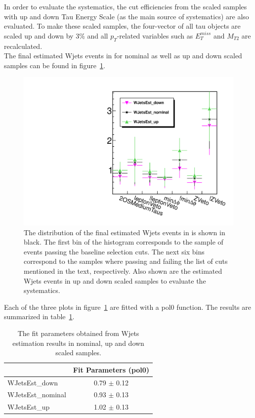 In order to evaluate the systematics, the cut efficiencies from the scaled samples with 
up and down Tau Energy Scale (as the main source of systematics) are also evaluated.
To make these scaled samples, the four-vector of all tau objects 
are scaled up and down by 3\% and all $p_T$-related variables such as $E_T^{miss}$ 
and $M_{T2}$ are recalculated.\\
The final estimated Wjets events in \binone for nominal as well as up and down scaled samples 
can be found in figure~\ref{fig:wjets_1}.  
\begin{figure}[!Hhtb]
\centering
\includegraphics[angle=0,scale=0.35]{TauTauFigs/WJets_bin1.pdf}
\caption{The distribution of the final estimated Wjets events in \binone is shown in black. 
 The first bin of the histogram corresponds to the sample of events passing the baseline selection cuts. 
The next six bins correspond to the samples where passing and failing the 
list of cuts mentioned in the text, respectively. Also shown are the estimated Wjets events in up and down scaled samples to evaluate the systematics.}
\label{fig:wjets_1}
\end{figure}

Each of the three plots in figure~\ref{fig:wjets_1} are fitted with a pol0 function. The results are summarized in table~\ref{tbl:fitpars}.
\begin{table}[!Hhtb]
\begin{center}
\begin{tabular}{lc}
\hline\hline
  & Fit Parameters (pol0) \\
\hline\hline
WJetsEst\_down & 0.79 $\pm$ 0.12 \\
WJetsEst\_nominal & 0.93 $\pm$ 0.13 \\
WJetsEst\_up & 1.02 $\pm$ 0.13 \\
\hline\hline
\end{tabular}
\caption{The fit parameters obtained from Wjets estimation results in nominal, up and down scaled samples.}
\label{tbl:fitpars}
\end{center}
\end{table}

